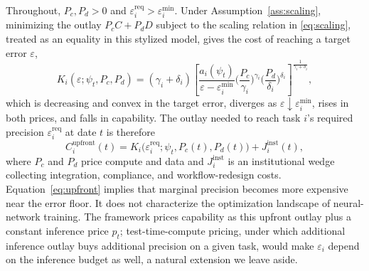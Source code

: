 \documentclass[12pt]{article}
\theoremstyle{plain}
\theoremstyle{definition}
\theoremstyle{remark}
\begin{document}
Throughout, $P_c,P_d>0$ and
$\varepsilon_i^{\mathrm{req}}>\varepsilon_i^{\min}$. Under
Assumption~\ref{ass:scaling}, minimizing the outlay $P_c C + P_d D$
subject to the scaling relation in \eqref{eq:scaling}, treated as an
equality in this stylized model,
gives the cost of reaching a target error $\varepsilon$,
\begin{equation}\label{eq:precisioncost}
K_i(\varepsilon;\psi_t,P_c,P_d)
= (\gamma_i+\delta_i)
  \left[\frac{a_i(\psi_t)}{\varepsilon-\varepsilon_i^{\min}}
  \Big(\frac{P_c}{\gamma_i}\Big)^{\gamma_i}
  \Big(\frac{P_d}{\delta_i}\Big)^{\delta_i}
  \right]^{\frac{1}{\gamma_i+\delta_i}},
\end{equation}
which is decreasing and convex in the target error, diverges as
$\varepsilon \downarrow \varepsilon_i^{\min}$, rises in both prices, and
falls in capability. The outlay needed to reach task $i$'s required
precision $\varepsilon_i^{\mathrm{req}}$ at date $t$ is therefore
\begin{equation}\label{eq:upfront}
C_i^{\mathrm{upfront}}(t)
= K_i\big(\varepsilon_i^{\mathrm{req}};\psi_t,P_c(t),P_d(t)\big)
+ J_i^{\mathrm{inst}}(t),
\end{equation}
where $P_c$ and $P_d$ price compute and data and $J_i^{\mathrm{inst}}$ is
an institutional wedge collecting integration, compliance, and
workflow-redesign costs. Equation~\eqref{eq:upfront} implies that marginal precision becomes
more expensive near the error floor. It does not characterize the
optimization landscape of neural-network training. The framework prices capability as
this upfront outlay plus a constant inference price $p_t$;
test-time-compute pricing, under which additional inference outlay buys
additional precision on a given task, would make $\varepsilon_i$ depend
on the inference budget as well, a natural extension we leave aside.
\end{document}
